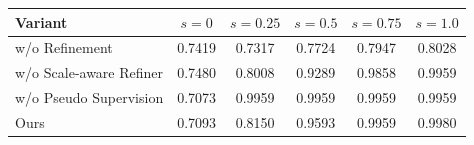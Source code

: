 \begin{tabular}{l|ccccc}
\toprule
Variant & $s=0$ & $s=0.25$ & $s=0.5$ & $s=0.75$ & $s=1.0$ \\
\midrule
w/o Refinement & 0.7419 & 0.7317 & 0.7724 & 0.7947 & 0.8028 \\
w/o Scale-aware Refiner & 0.7480 & 0.8008 & 0.9289 & 0.9858 & 0.9959 \\
w/o Pseudo Supervision & 0.7073 & 0.9959 & 0.9959 & 0.9959 & 0.9959 \\
Ours & 0.7093 & 0.8150 & 0.9593 & 0.9959 & 0.9980 \\
\bottomrule
\end{tabular}
